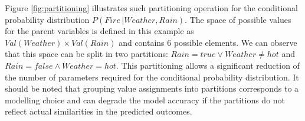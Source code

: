 Figure \ref{fig:partitioning} illustrates such partitioning operation for the conditional probability distribution $P(\mathit{Fire} \, | \mathit{Weather}, \mathit{Rain})$.  The space of possible values for the parent variables is defined in this example as $Val(\mathit{Weather}) \times Val(\mathit{Rain})$ and contains 6 possible elements.  We can observe that this space can be split in two partitions: $\mathit{Rain}\!=\mathit{true} \lor \mathit{Weather}\!\neq\mathit{hot}$ and $\mathit{Rain}\!=\mathit{false} \land \mathit{Weather}\!=\mathit{hot}$. This partitioning allows a significant reduction of the number of parameters required for the conditional probability distribution.  It should be noted that grouping value assignments into partitions corresponds to a modelling choice and can degrade the model accuracy if the partitions do not reflect actual similarities in the predicted outcomes.



